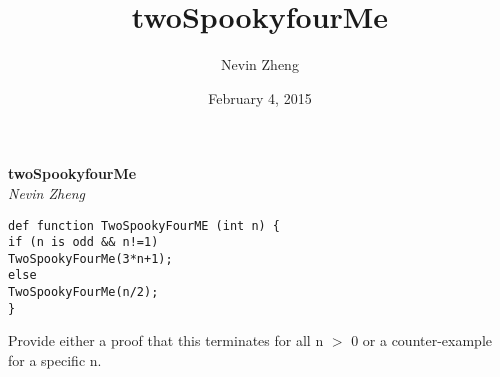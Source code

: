 \documentclass{article}
\author{Nevin Zheng}
\title{twoSpookyfourMe}
\date{February 4, 2015}
\begin{document}
   \begin{center}
      \Large\textbf{twoSpookyfourMe}\\
 
      \large\textit{Nevin Zheng}
      
   \end{center}
   
\begin{lstlisting}
def function TwoSpookyFourME (int n) {
if (n is odd && n!=1)
TwoSpookyFourMe(3*n+1);
else
TwoSpookyFourMe(n/2);
}
\end{lstlisting}
Provide either a proof that this terminates for all n $>$ 0 or a counter-example for a specific n.
\end{document}
